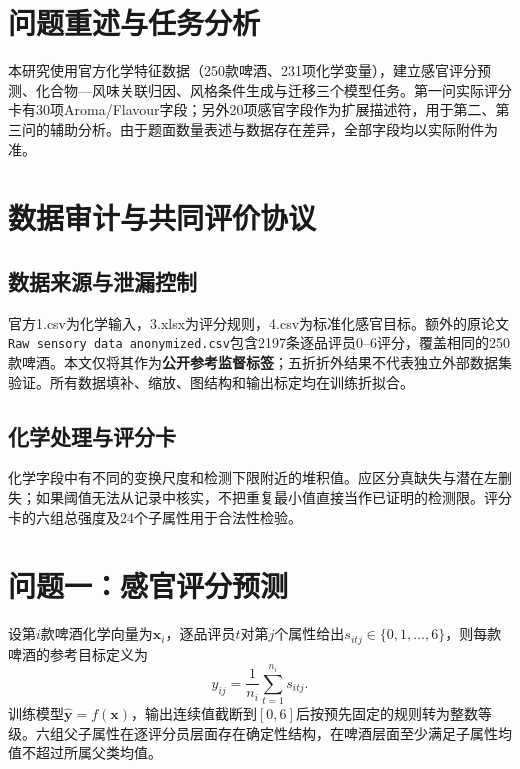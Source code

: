 \section{问题重述与任务分析}
本研究使用官方化学特征数据（250款啤酒、231项化学变量），建立感官评分预测、化合物—风味关联归因、风格条件生成与迁移三个模型任务。第一问实际评分卡有30项Aroma/Flavour字段；另外20项感官字段作为扩展描述符，用于第二、第三问的辅助分析。由于题面数量表述与数据存在差异，全部字段均以实际附件为准。

\section{数据审计与共同评价协议}
\subsection{数据来源与泄漏控制}
官方1.csv为化学输入，3.xlsx为评分规则，4.csv为标准化感官目标。额外的原论文\texttt{Raw sensory data anonymized.csv}包含2197条逐品评员0--6评分，覆盖相同的250款啤酒。本文仅将其作为\textbf{公开参考监督标签}；五折折外结果不代表独立外部数据集验证。所有数据填补、缩放、图结构和输出标定均在训练折拟合。

\subsection{化学处理与评分卡}
化学字段中有不同的变换尺度和检测下限附近的堆积值。应区分真缺失与潜在左删失；如果阈值无法从记录中核实，不把重复最小值直接当作已证明的检测限。评分卡的六组总强度及24个子属性用于合法性检验。

\section{问题一：感官评分预测}
设第$i$款啤酒化学向量为$\bm{x}_i$，逐品评员$t$对第$j$个属性给出$s_{itj}\in\{0,1,\ldots,6\}$，则每款啤酒的参考目标定义为
\begin{equation}
 y_{ij}=\frac{1}{n_i}\sum_{t=1}^{n_i}s_{itj}.
\end{equation}
训练模型$\widehat{\bm y}=f(\bm x)$，输出连续值截断到$[0,6]$后按预先固定的规则转为整数等级。六组父子属性在逐评分员层面存在确定性结构，在啤酒层面至少满足子属性均值不超过所属父类均值。

